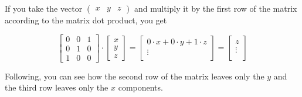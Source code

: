 \documentclass[12pt]{article}
\begin{document}
If you take the vector $\begin{pmatrix} x & y & z \end{pmatrix}$ and multiply 
it by the first row of the matrix according to the matrix dot product, you get

\begin{equation}
  \begin{bmatrix}
    0 & 0 & 1 \\
    0 & 1 & 0 \\
    1 & 0 & 0
  \end{bmatrix}
  \cdot
  \begin{bmatrix}
    x \\ y \\ z
  \end{bmatrix}
  =
  \begin{bmatrix}
    0 \cdot x + 0 \cdot y + 1 \cdot z \\
    \vdots \\
  \end{bmatrix}
  =
  \begin{bmatrix}
    z \\
    \vdots \\
  \end{bmatrix}
\end{equation}

Following, you can see how the second row of the matrix leaves only the $y$ and
the third row leaves only the $x$ components.
\end{document}
